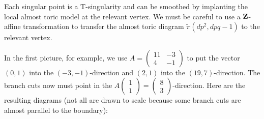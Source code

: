 \documentclass{article}
\begin{document}
\begin{Example}
\begin{center}
\begin{tikzpicture}
\end{tikzpicture}
\end{center}
Each singular point is a T-singularity and can be smoothed by
implanting the local almost toric model at the relevant vertex. We
must be careful to use a \(\ZZ\)-affine transformation to transfer
the almost toric diagram \(\tilde{\pi}(dp^2,dpq-1)\) to the relevant
vertex.


In the first picture, for example, we use \(A=\begin{pmatrix}11 & -3
\\ 4 & -1\end{pmatrix}\) to put the vector \((0,1)\) into the
\((-3,-1)\)-direction and \((2,1)\) into the
\((19,7)\)-direction. The branch cuts now must point in the
\(A\begin{pmatrix} 1 \\ 1\end{pmatrix}=\begin{pmatrix} 8
\\ 3\end{pmatrix}\)-direction. Here are the resulting diagrams (not
all are drawn to scale because some branch cuts are almost parallel
to the boundary):
\begin{center}
\end{center}
\begin{center}
\end{center}
\end{Example}
\end{document}
